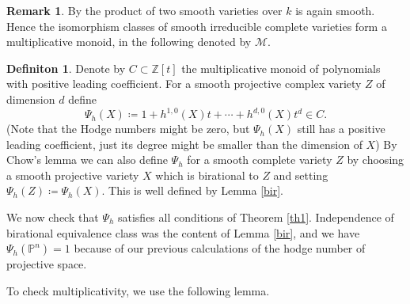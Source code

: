 \documentclass[11pt, a4paper, german]{article}
\theoremstyle{plain}
\theoremstyle{definition}
\newtheorem{definition}[theorem]{Definiton}
\newtheorem{remark}[theorem]{Remark}
\begin{document}
\begin{remark}
    By \cite[Prop. 10.1 (d)]{Ha} the product of two smooth varieties over $k$ is again smooth. Hence the isomorphism classes of smooth
    irreducible complete varieties form a multiplicative monoid, in the following denoted by $\mathcal{M}$.
\end{remark}
\begin{definition}
    Denote by $C \subset \mathbb{Z}[t]$ the multiplicative monoid of polynomials with positive leading coefficient.
    For a smooth projective complex variety $Z$ of dimension $d$ define
    \[
        \Psi_h(X) \coloneqq1 + h^{1,0}(X)t + \cdots + h^{d,0}(X)t^d \in C.
    \]
    (Note that the Hodge numbers might be zero, but $\Psi_h(X)$ still has a positive leading coefficient, 
    just its degree might be smaller than the dimension of $X$)
    By Chow's lemma we can also define $\Psi_h$ for a smooth complete variety $Z$ by choosing a smooth projective variety $X$ which is birational
    to $Z$ and setting $\Psi_h(Z) \coloneqq \Psi_h(X)$. This is well defined by Lemma \ref{bir}.
\end{definition}

We now check that $\Psi_h$ satisfies all conditions of Theorem \ref{th1}. Independence of birational equivalence class was the content of Lemma
\ref{bir}, and we have $\Psi_h(\mathbb{P}^n) = 1$ because of our previous calculations of the hodge number of projective space.

To check multiplicativity, we use the following lemma.
\end{document}
